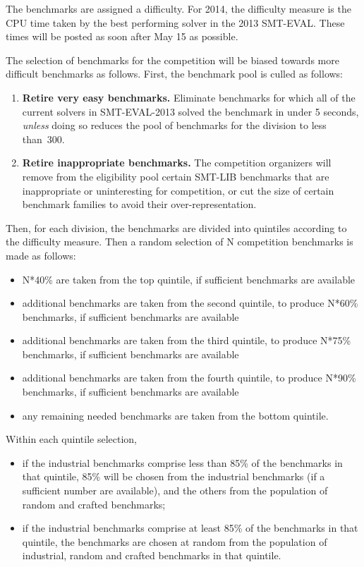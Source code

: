 \documentclass[12pt]{article}
\begin{document}

The benchmarks are assigned a difficulty. For 2014, the difficulty measure is the
CPU time taken by the best performing solver in the 2013 SMT-EVAL. These times will be posted 
as soon after May 15 as possible.

The selection of benchmarks for the competition will be biased towards more difficult benchmarks
as follows. First, the benchmark pool is culled as follows:
\begin{enumerate}

\item \textbf{Retire very easy benchmarks.} %
  Eliminate benchmarks for which all of the current solvers in SMT-EVAL-2013
  solved the benchmark in under 5 seconds,
  \emph{unless} doing so reduces the pool of
    benchmarks for the division to less than~300.

\item \textbf{Retire inappropriate benchmarks.} %
  The competition organizers will remove from the eligibility pool
  certain SMT-LIB benchmarks that are inappropriate or uninteresting
  for competition, or cut the size of certain benchmark families to
  avoid their over-representation.

\end{enumerate}

Then, for each division, the benchmarks are divided into quintiles according to the difficulty measure.
Then a random selection of N competition benchmarks is made as follows:
\begin{itemize}
\item N*40\% are taken from the top quintile, if sufficient benchmarks are available
\item additional benchmarks are taken from the second quintile, to produce N*60\% benchmarks, if sufficient benchmarks are available
\item additional benchmarks are taken from the third quintile, to produce N*75\% benchmarks, if sufficient benchmarks are available
\item additional benchmarks are taken from the fourth quintile, to produce N*90\% benchmarks, if sufficient benchmarks are available
\item any remaining needed benchmarks are taken from the bottom quintile.
\end{itemize}
Within each quintile selection,
\begin{itemize}
\item if the industrial benchmarks comprise less than 85\% of the benchmarks in that quintile, 85\% will be chosen from the industrial benchmarks (if a sufficient number are available), and the others from the population of random and crafted benchmarks;
\item if the industrial benchmarks comprise at least 85\% of the benchmarks in that quintile, the benchmarks are chosen at random from the population of industrial, random and crafted benchmarks in that quintile.
\end{itemize}
\end{document}
